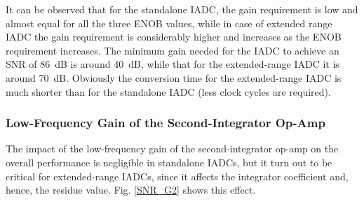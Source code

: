 It can be observed that for the standalone IADC, the gain requirement is low and almost equal for all the three ENOB values, while in case of extended range IADC the gain requirement is considerably higher and increases as the ENOB requirement increases. The minimum gain needed for the IADC to achieve an SNR of 86~dB is around 40~dB, while that for the extended-range IADC it is around 70~dB. Obviously the conversion time for the extended-range IADC is much shorter than for the standalone IADC (less clock cycles are required).


\subsubsection{Low-Frequency Gain of the Second-Integrator Op-Amp}
The impact of the low-frequency gain of the second-integrator op-amp on the overall performance is negligible in standalone IADCs, but it turn out to be critical for extended-range IADCs, since it affects the integrator coefficient and, hence, the residue value. Fig. \ref{SNR_G2} shows this effect.
